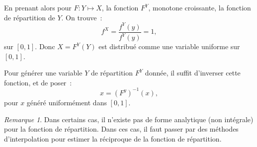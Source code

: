 \documentclass{article}
\theoremstyle{definition}
\theoremstyle{remark}
\newtheorem*{rmq}{Remarque}
\begin{document}
	En prenant alors pour $F : Y \mapsto X$, la fonction $F^Y$, monotone croissante, la fonction de répartition de $Y$. On trouve~:
	\[f^X = \frac {f^Y(y)}{f^Y(y)} = 1,\]
	sur $[0, 1]$. Donc $X = F^Y(Y)$ est distribué comme une variable uniforme sur $[0, 1]$.

	Pour générer une variable $Y$ de répartition $F^Y$ donnée, il suffit d'inverser cette fonction, et de poser~:
	\[x = \left(F^{y}\right)^{-1}(x),\]
	pour $x$ généré uniformément dans $[0, 1]$.

	\begin{rmq} Dans certains cas, il n'existe pas de forme analytique (non intégrale) pour la fonction de répartition. Dans ces cas, il faut passer par des
	méthodes d'interpolation pour estimer la réciproque de la fonction de répartition.
	\end{rmq}
\end{document}
